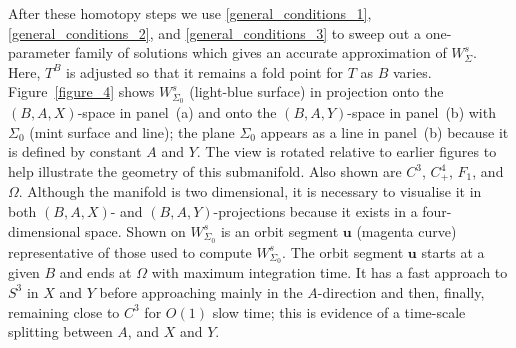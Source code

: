 \documentclass{ws-ijbc}
\begin{document}
After these homotopy steps we use \eqref{general_conditions_1}, \eqref{general_conditions_2}, and \eqref{general_conditions_3} to sweep out a one-parameter family of solutions which gives an accurate approximation of $W^s_\Sigma$.  Here, $T^B$ is adjusted so that it remains a fold point for $T$ as $B$ varies. Figure~\ref{figure_4} shows $W^s_{\Sigma_0}$ (light-blue surface) in projection onto the $(B,A,X)$-space in panel~(a) and onto the $(B,A,Y)$-space in panel~(b) with $\Sigma_0$ (mint surface and line); the plane $\Sigma_0$ appears as a line in panel~(b) because it is defined by constant $A$ and $Y$.  The view is rotated relative to earlier figures to help illustrate the geometry of this submanifold.  Also shown are $C^3$, $C^4_+$, $F_1$, and $\Omega$.  Although the manifold is two dimensional, it is necessary to visualise it in both $(B,A,X)$- and $(B,A,Y)$-projections because it exists in a four-dimensional space.  Shown on $W^s_{\Sigma_0}$ is an orbit segment $\mathbf{u}$ (magenta curve) representative of those used to compute $W^s_{\Sigma_0}$.  The orbit segment $\mathbf{u}$ starts at a given $B$ and ends at $\Omega$ with maximum integration time.  It has a fast approach to $S^3$ in $X$ and $Y$ before approaching mainly in the $A$-direction and then, finally, remaining close to $C^3$ for $O(1)$ slow time; this is evidence of a time-scale splitting  between $A$, and $X$ and $Y$.
\end{document}
